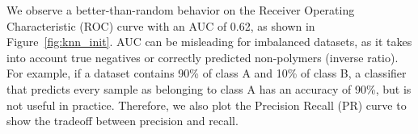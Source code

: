 We observe a better-than-random behavior on the Receiver Operating Characteristic (ROC) curve with an AUC of 0.62, as shown in 
Figure~\ref{fig:knn_init}. %
AUC can be misleading for imbalanced datasets, 
as it takes into account true negatives or correctly predicted non-polymers (inverse ratio).
For example, if a dataset contains 90\% of class A and 10\% of class B, 
a classifier that predicts every sample as belonging to class A has an accuracy of 90\%, 
but is not useful in practice.
Therefore, we also plot the Precision Recall (PR) curve to show the tradeoff between precision and recall.%
